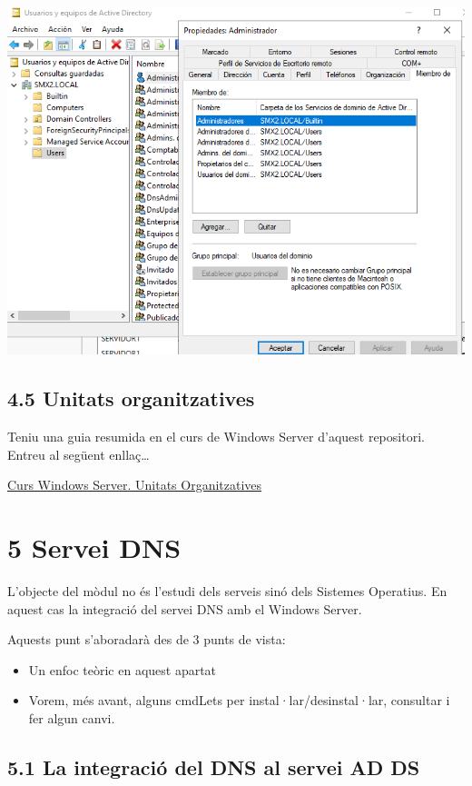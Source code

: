 \documentclass[
  a4paper,
]{article}
\providecommand{\tightlist}{%
  \setlength{\itemsep}{0pt}\setlength{\parskip}{0pt}}
\begin{document}
\includegraphics{png/usuaris15.png}

\subsection{4.5 Unitats organitzatives}\label{unitats-organitzatives}

Teniu una guia resumida en el curs de Windows Server d'aquest
repositori. Entreu al següent enllaç\ldots{}

\href{https://github.com/tofermos/Windows-Server/blob/main/md/UnitºatsOrganitzatives.md}{Curs
Windows Server. Unitats Organitzatives}

\section{5 Servei DNS}\label{servei-dns}

L'objecte del mòdul no és l'estudi dels serveis sinó dels Sistemes
Operatius. En aquest cas la integració del servei DNS amb el Windows
Server.

Aquests punt s'aboradarà des de 3 punts de vista:

\begin{itemize}
\tightlist
\item
  Un enfoc teòric en aquest apartat
\item
  Vorem, més avant, alguns cmdLets per instal·lar/desinstal·lar,
  consultar i fer algun canvi.
\end{itemize}

\subsection{5.1 La integració del DNS al servei AD
DS}\label{la-integraciuxf3-del-dns-al-servei-ad-ds}
\end{document}
